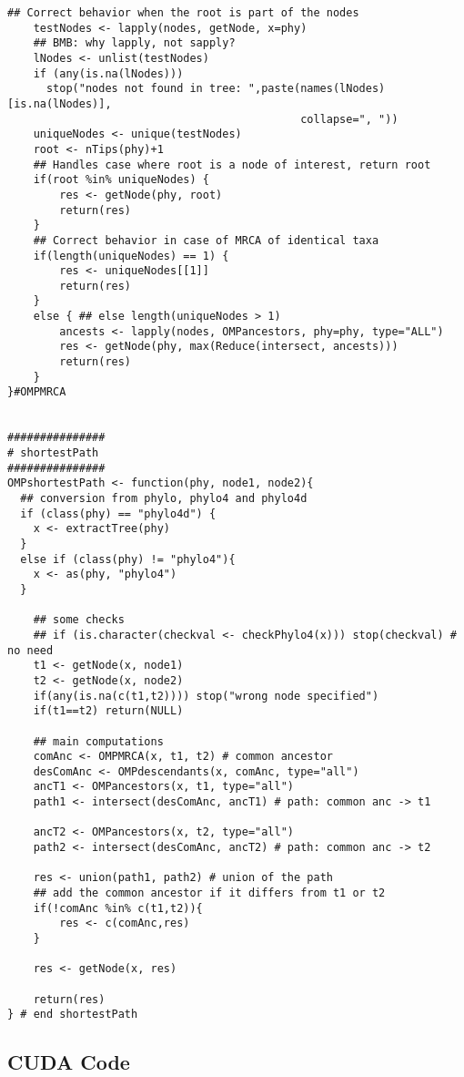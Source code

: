 \documentclass[11pt,letterpaper]{article}
\begin{document}
\begin{lstlisting}[style=MyR]
    ## Correct behavior when the root is part of the nodes
    testNodes <- lapply(nodes, getNode, x=phy)
    ## BMB: why lapply, not sapply?
    lNodes <- unlist(testNodes)
    if (any(is.na(lNodes)))
      stop("nodes not found in tree: ",paste(names(lNodes)[is.na(lNodes)],
                                             collapse=", "))
    uniqueNodes <- unique(testNodes)
    root <- nTips(phy)+1
    ## Handles case where root is a node of interest, return root
    if(root %in% uniqueNodes) {
        res <- getNode(phy, root)
        return(res)
    }
    ## Correct behavior in case of MRCA of identical taxa
    if(length(uniqueNodes) == 1) {
        res <- uniqueNodes[[1]]
        return(res)
    }
    else { ## else length(uniqueNodes > 1)
        ancests <- lapply(nodes, OMPancestors, phy=phy, type="ALL")
        res <- getNode(phy, max(Reduce(intersect, ancests)))
        return(res)
    }
}#OMPMRCA


###############
# shortestPath
###############
OMPshortestPath <- function(phy, node1, node2){
  ## conversion from phylo, phylo4 and phylo4d
  if (class(phy) == "phylo4d") {
    x <- extractTree(phy)
  }
  else if (class(phy) != "phylo4"){
    x <- as(phy, "phylo4")
  }

    ## some checks
    ## if (is.character(checkval <- checkPhylo4(x))) stop(checkval) # no need
    t1 <- getNode(x, node1)
    t2 <- getNode(x, node2)
    if(any(is.na(c(t1,t2)))) stop("wrong node specified")
    if(t1==t2) return(NULL)

    ## main computations
    comAnc <- OMPMRCA(x, t1, t2) # common ancestor
    desComAnc <- OMPdescendants(x, comAnc, type="all")
    ancT1 <- OMPancestors(x, t1, type="all")
    path1 <- intersect(desComAnc, ancT1) # path: common anc -> t1

    ancT2 <- OMPancestors(x, t2, type="all")
    path2 <- intersect(desComAnc, ancT2) # path: common anc -> t2

    res <- union(path1, path2) # union of the path
    ## add the common ancestor if it differs from t1 or t2
    if(!comAnc %in% c(t1,t2)){
        res <- c(comAnc,res)
    }

    res <- getNode(x, res)

    return(res)
} # end shortestPath
\end{lstlisting}

\subsection{CUDA Code}
\end{document}
